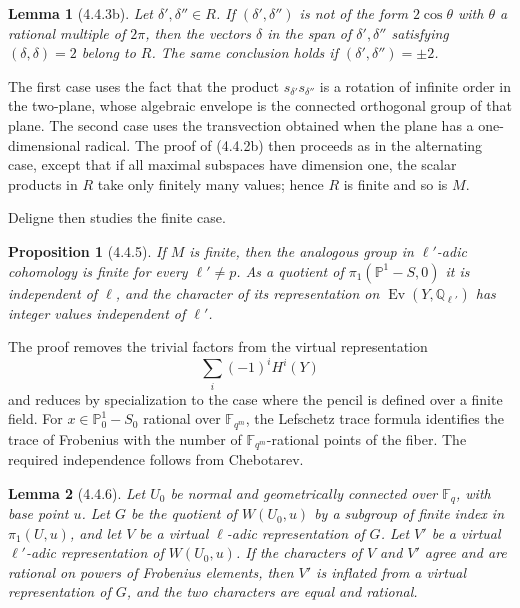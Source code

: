 \documentclass[11pt]{article}
\newtheorem{proposition}{Proposition}
\newtheorem{lemma}{Lemma}
\theoremstyle{remark}
\begin{document}
\begin{lemma}[4.4.3b]
Let $\delta',\delta''\in R$. If $(\delta',\delta'')$ is not of the form $2\cos\theta$ with $\theta$ a rational multiple of $2\pi$, then the vectors $\delta$ in the span of $\delta',\delta''$ satisfying $(\delta,\delta)=2$ belong to $R$. The same conclusion holds if $(\delta',\delta'')=\pm2$.
\end{lemma}

The first case uses the fact that the product $s_{\delta'}s_{\delta''}$ is a rotation of infinite order in the two-plane, whose algebraic envelope is the connected orthogonal group of that plane. The second case uses the transvection obtained when the plane has a one-dimensional radical. The proof of (4.4.2b) then proceeds as in the alternating case, except that if all maximal subspaces have dimension one, the scalar products in $R$ take only finitely many values; hence $R$ is finite and so is $M$.

Deligne then studies the finite case.

\begin{proposition}[4.4.5]
If $M$ is finite, then the analogous group in $\ell'$-adic cohomology is finite for every $\ell'\ne p$. As a quotient of $\pi_1(\mathbb P^1-S,0)$ it is independent of $\ell$, and the character of its representation on $\operatorname{Ev}(Y,\mathbb Q_{\ell'})$ has integer values independent of $\ell'$.
\end{proposition}

The proof removes the trivial factors from the virtual representation
\[
\sum_i(-1)^i H^i(Y)
\]
and reduces by specialization to the case where the pencil is defined over a finite field. For $x\in\mathbb P^1_0-S_0$ rational over $\mathbb F_{q^m}$, the Lefschetz trace formula identifies the trace of Frobenius with the number of $\mathbb F_{q^m}$-rational points of the fiber. The required independence follows from Chebotarev.

\begin{lemma}[4.4.6]
Let $U_0$ be normal and geometrically connected over $\mathbb F_q$, with base point $u$. Let $G$ be the quotient of $W(U_0,u)$ by a subgroup of finite index in $\pi_1(U,u)$, and let $V$ be a virtual $\ell$-adic representation of $G$. Let $V'$ be a virtual $\ell'$-adic representation of $W(U_0,u)$. If the characters of $V$ and $V'$ agree and are rational on powers of Frobenius elements, then $V'$ is inflated from a virtual representation of $G$, and the two characters are equal and rational.
\end{lemma}
\end{document}
